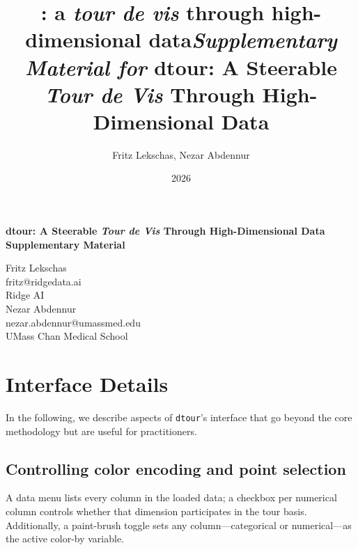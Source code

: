 \documentclass[11pt]{article}
\title{\dtour{}: a \emph{tour de vis} through high-dimensional data}
\title{\textit{Supplementary Material for} dtour: A Steerable \emph{Tour de Vis} Through High-Dimensional Data}
\author{Fritz Lekschas, Nezar Abdennur}
\date{2026}
\newcommand{\dtour}{\texorpdfstring{\texttt{dtour}\xspace}{dtour}}
\begin{document}

 \begin{titlepage}
 \begin{center}
 {\selectfont
  {\LARGE \textbf{dtour: A Steerable \emph{Tour de Vis} Through High-Dimensional Data}}\\[1.25cm]
  {\LARGE \textbf{Supplementary Material}\\[1.75cm]}

  {\Large Fritz Lekschas}\\
  {fritz@ridgedata.ai}\\ Ridge AI\\[.5cm]

  {\Large Nezar Abdennur}\\
  {nezar.abdennur@umassmed.edu \\ UMass Chan Medical School}\\[1.75cm]

 }
 \end{center}
 \end{titlepage}
 



\section{Interface Details}

In the following, we describe aspects of \dtour{}'s interface that go beyond the core methodology but are useful for practitioners.

\subsection{Controlling color encoding and point selection}
A data menu lists every column in the loaded data; a checkbox per numerical column controls whether that dimension participates in the tour basis. Additionally, a paint-brush toggle sets any column---categorical or numerical---as the active color-by variable. 
\end{document}
